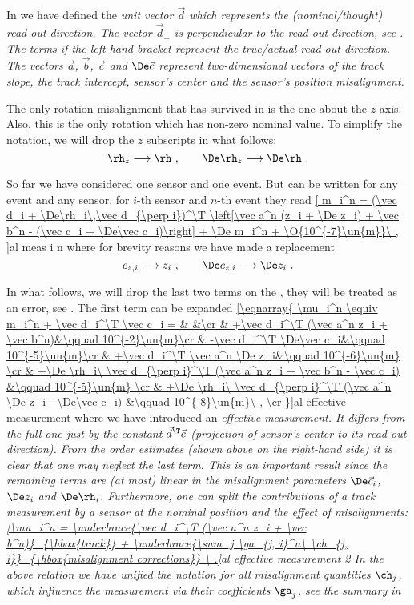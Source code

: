 In  we have defined the \em{unit} vector $\vec d$ which represents the (nominal/thought) \em{read-out direction}. The vector $\vec d_\perp$ is perpendicular to the read-out direction, see . The terms if the left-hand bracket represent the true/actual read-out direction. The vectors $\vec a$, $\vec b$, $\vec c$ and $\De \vec c$ represent two-dimensional vectors of the track slope, the track intercept, sensor's center and the sensor's position misalignment.

The only rotation misalignment that has survived in  is the one about the $z$ axis. Also, this is the only rotation which has non-zero nominal value. To simplify the notation, we will drop the $z$ subscripts in what follows:
$$\rh_z \longrightarrow \rh\ ,\qquad \De\rh_z \longrightarrow \De\rh\ .$$

So far we have considered one sensor and one event. But  can be written for any event and any sensor, for $i$-th sensor and $n$-th event they read
\eqref{
m_i^n = (\vec d_i + \De\rh_i\,\vec d_{\perp i})^\T \left[\vec a^n (z_i + \De z_i) + \vec b^n - (\vec c_i + \De\vec c_i)\right] + \De m_i^n + \O{10^{-7}\un{m}}\ ,
}{al meas i n}
where for brevity reasons we have made a replacement
$$c_{z,i} \longrightarrow z_i\ ,\qquad \De c_{z,i} \longrightarrow \De z_i\ .$$

In what follows, we will drop the last two terms on the \rhs, they will be treated as an error, see . The first term can be expanded
\eqref{\eqnarray{
\mu_i^n \equiv m_i^n + \vec d_i^\T \vec c_i = & &\cr
& +\vec d_i^\T (\vec a^n z_i + \vec b^n)&\qquad 10^{-2}\un{m}\cr
& -\vec d_i^\T \De\vec c_i&\qquad 10^{-5}\un{m}\cr
& +\vec d_i^\T \vec a^n \De z_i&\qquad 10^{-6}\un{m} \cr
& +\De \rh_i\ \vec d_{\perp i}^\T (\vec a^n z_i + \vec b^n - \vec c_i) &\qquad 10^{-5}\un{m} \cr
& +\De \rh_i\ \vec d_{\perp i}^\T (\vec a^n \De z_i - \De\vec c_i) &\qquad 10^{-8}\un{m}\ , \cr
}}{al effective measurement}
where we have introduced an \em{effective measurement}. It differs from the full one just by the constant $\vec d^\T \vec c$ (projection of sensor's center to its read-out direction). From the order estimates (shown above on the right-hand side) it is clear that one may neglect the last term. This is an important result since the remaining terms are (at most) linear in the misalignment parameters $\De \vec c_i$, $\De z_i$ and $\De \rh_i$. Furthermore, one can split the contributions of a track measurement by a sensor at the nominal position and the effect of misalignments:
\eqref{\mu_i^n =
\underbrace{\vec d_i^\T (\vec a^n z_i + \vec b^n)}_{\hbox{track}}
+
\underbrace{\sum_j \ga_{j, i}^n\ \ch_{j, i}}_{\hbox{misalignment corrections}}
\ .}{al effective measurement 2}
In the above relation we have unified the notation for all misalignment quantities $\ch_j$, which influence the measurement via their coefficients $\ga_j$, see the summary in 

